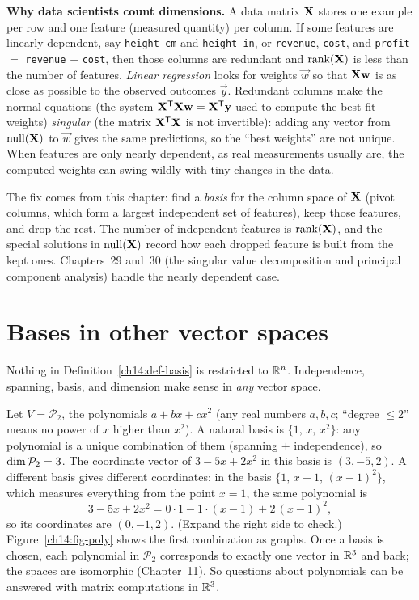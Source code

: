 \begin{applicationbox}
\textbf{Why data scientists count dimensions.} A data matrix $\mathbf{X}$ stores one
example per row and one feature (measured quantity) per column. If some features are linearly dependent,
say \texttt{height\_cm} and \texttt{height\_in}, or
\texttt{revenue}, \texttt{cost}, and \texttt{profit} $=$ \texttt{revenue} $-$
\texttt{cost}, then those columns are redundant and $\operatorname{rank}(\mathbf{X})$ is
less than the number of features. \emph{Linear regression} looks for weights $\vec{w}$
so that $\mathbf{X}\mathbf{w}$ is as close as possible to the observed outcomes $\vec{y}$. Redundant
columns make the normal equations (the system $\mathbf{X}^{\mathsf{T}}\mathbf{X}\mathbf{w} = \mathbf{X}^{\mathsf{T}}\mathbf{y}$ used to compute the best-fit weights) \emph{singular} (the matrix $\mathbf{X}^{\mathsf{T}}\mathbf{X}$ is not invertible): adding any vector from $\operatorname{null}(\mathbf{X})$ to $\vec{w}$ gives the same predictions, so the ``best weights'' are not unique. When features are only nearly dependent, as real measurements usually are, the computed weights can swing wildly with tiny changes in the data.

The fix comes from this chapter: find a \emph{basis} for the column space of $\mathbf{X}$ (pivot columns, which form a largest independent set of features), keep those features, and drop the rest. The number of independent features is $\operatorname{rank}(\mathbf{X})$, and the special solutions in $\operatorname{null}(\mathbf{X})$ record how each dropped feature is built from the kept ones. Chapters~29 and~30 (the singular value decomposition and principal component analysis) handle the nearly dependent case.
\end{applicationbox}

\section{Bases in other vector spaces}
\label{ch14:other}

Nothing in Definition~\ref{ch14:def-basis} is restricted to $\mathbb{R}^n$. Independence,
spanning, basis, and dimension make sense in \emph{any} vector space.

\begin{example}
\label{ch14:ex-poly}
Let $V = \mathcal P_2$, the polynomials $a + bx + cx^2$ (any real numbers $a,b,c$; ``degree $\le 2$'' means
no power of $x$ higher than $x^2$). A natural basis is
$\{1,\, x,\, x^2\}$: any polynomial is a unique combination of them (spanning $+$
independence), so $\operatorname{dim} \mathcal P_2 = 3$. The coordinate vector of $3 - 5x +
2x^2$ in this basis is $(3,-5,2)$. A different basis gives different coordinates: in the
basis $\{1,\, x-1,\, (x-1)^2\}$, which measures everything from the point $x=1$, the same polynomial is
\[
  3 - 5x + 2x^2 = 0\cdot 1 - 1\cdot(x-1) + 2\,(x-1)^2,
\]
so its coordinates are $(0,-1,2)$. (Expand the right side to check.) Figure~\ref{ch14:fig-poly}
shows the first combination as graphs. Once a basis is chosen, each polynomial in $\mathcal P_2$
corresponds to exactly one vector in $\mathbb{R}^3$ and back; the spaces are
isomorphic (Chapter~11). So questions about polynomials can be answered with
matrix computations in $\mathbb{R}^3$.
\end{example}

